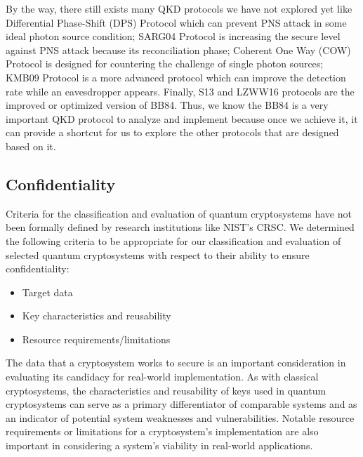 \documentclass[sigconf]{acmart}
\begin{document}
By the way, there still exists many QKD protocols we have not explored yet like Differential Phase-Shift (DPS) Protocol which can prevent PNS attack in some ideal photon source condition; SARG04 Protocol is increasing the secure level against PNS attack because its reconciliation phase; Coherent One Way (COW) Protocol is designed for countering the challenge of single photon sources; KMB09 Protocol is a more advanced protocol which can improve the detection rate while an eavesdropper appears. Finally, S13 and LZWW16 protocols are the improved or optimized version of BB84. Thus, we know the BB84 is a very important QKD protocol to analyze and implement because once we achieve it, it can provide a shortcut for us to explore the other protocols that are designed based on it\cite{khan_security_2020}. 


\subsection{Confidentiality} %
Criteria for the classification and evaluation of quantum cryptosystems have not been formally defined by research institutions like NIST's CRSC. We determined the following criteria to be appropriate for our classification and evaluation of selected quantum cryptosystems with respect to their ability to ensure confidentiality:
\begin{itemize}
\item Target data
\item Key characteristics and reusability
\item Resource requirements/limitations
\end{itemize}

The data that a cryptosystem works to secure is an important consideration in evaluating its candidacy for real-world implementation. As with classical cryptosystems, the characteristics and reusability of keys used in quantum cryptosystems can serve as a primary differentiator of comparable systems and as an indicator of potential system weaknesses and vulnerabilities. Notable resource requirements or limitations for a cryptosystem's implementation are also important in considering a system's viability in real-world applications.
\end{document}
